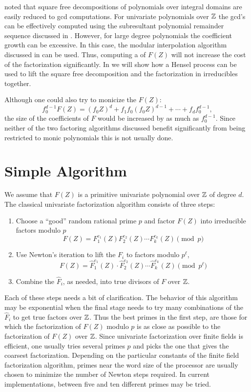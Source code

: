  noted that square free decompositions of
polynomials over integral domains are easily reduced to {\sc gcd}
computations.  For univariate polynomials over $\mathbb{Z}$ the {\sc gcd}'s
can be effectively computed using the subresultant polynomial
remainder sequence
discussed in .  However, for large
degree polynomials the coefficient growth can be excessive.  In this
case, the modular interpolation algorithm discussed in
 can be used.  Thus, computing a  of $F(Z)$ will not increase the cost of the factorization 
significantly.  In  we will show how a Hensel process 
can be used to lift the square free decomposition and the factorization 
in irreducibles together. 

Although one could also try to monicize the $F(Z)$:
\[
f_0^{d-1}F(Z) = (f_0 Z)^d + f_1 f_0 (f_0 Z)^{d-1} + \cdots + f_d
f_0^{d-1},
\]
the size of the coefficients of $F$ would be increased by as much as
$f_0^{d-1}$.  Since neither of the two factoring algorithms discussed
benefit significantly from being restricted to monic polynomials this
is not usually done.

\section{Simple Algorithm}
\label{UF:Simple:Sec}

We assume that $F(Z)$ is a primitive univariate
polynomial over $\mathbb{Z}$
of degree $d$.  The classical univariate factorization algorithm
consists of three steps:
\begin{enumerate}
\item Choose a ``good'' random rational prime $p$ and factor $F(Z)$
into irreducible factors modulo $p$ 
\[
F(Z) = F_1^{e_1}(Z) F_2^{e_2}(Z) \cdots F_k^{e_k}(Z) \pmod{p}
\]

\item Use Newton's iteration to lift the $F_i$ to factors modulo
$p^{\ell}$,
\[
F(Z) = \hat{F}_1^{e_1}(Z) \cdot \hat{F}_2^{e_2}(Z) \cdots \hat{F}_k^{e_k}(Z)
\pmod{p^{\ell}}
\]

\item Combine the $\hat{F}_i$, as needed, into true divisors of $F$
over $\mathbb{Z}$.
\end{enumerate}

Each of these steps needs a bit of clarification.  The behavior of
this algorithm may be exponential when the final stage needs to
try many combinations of the $\hat{F}_i$ to get true factors over
$\mathbb{Z}$. Thus the best primes in the first step, are those for which the
factorization of $F(Z)$ modulo $p$ is as close as possible to the
factorization of $F(Z)$ over $\mathbb{Z}$.  Since univariate factorization
over finite fields is efficient, one usually tries several primes $p$
and picks the one that gives the coarsest factorization.  Depending on
the particular constants of the finite field factorization algorithm,
primes near the word size of the processor are usually chosen to
minimize the number of Newton steps required.  In current
implementations, between five and ten different primes may be tried.

